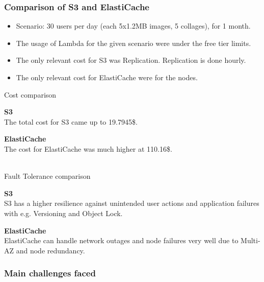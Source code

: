 \documentclass[11pt,t,usepdftitle=false,aspectratio=169]{beamer}
\begin{document}
\begin{frame}
	\frametitle{Comparison of S3 and ElastiCache}
	{\footnotesize \begin{itemize}
		\item Scenario: 30 users per day (each 5x1.2MB images, 5 collages), for 1 month.
		\item The usage of Lambda for the given scenario were under the free tier limits.
		\item The only relevant cost for S3 was Replication. Replication is done hourly.
		\item The only relevant cost for ElastiCache were for the nodes.
	\end{itemize}}

	{\normalsize Cost comparison}\vspace{1mm}\\
	\hfill\vline\hfill
	\begin{minipage}{0.48\textwidth}
		\textbf{{\small S3}\vspace{1mm}}\\
		\footnotesize
		The total cost for S3 came up to 19.7945\$.
	\end{minipage}
\hfill\vline\hfill
	\begin{minipage}{0.48\textwidth}
		\textbf{{\small ElastiCache}\vspace{1mm}}\\
		\footnotesize
		The cost for ElastiCache was much higher at 110.16\$.
	\end{minipage}\vspace{2mm}\\
	{\normalsize Fault Tolerance comparison}\vspace{1mm}\\
	\hfill\vline\hfill
	\begin{minipage}{0.48\textwidth}
		\textbf{{\small S3}\vspace{1mm}}\\
		\footnotesize
		S3 has a higher resilience against unintended user actions and application failures with e.g. Versioning and Object Lock.
	\end{minipage}
\hfill\vline\hfill
	\begin{minipage}{0.48\textwidth}
		\textbf{{\small ElastiCache}\vspace{1mm}}\\
		\footnotesize
		ElastiCache can handle network outages and node failures very well due to Multi-AZ and node redundancy.
	\end{minipage}
	
\end{frame}

\begin{frame}
	\frametitle{Main challenges faced}
	
\end{frame}
\end{document}

